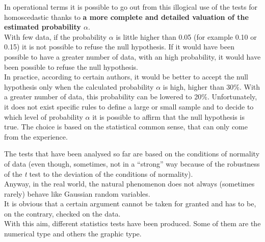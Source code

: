 \begin{frame}
  \begin{small}
    \vspace*{.25cm}
    In operational terms it is possible to go out from this illogical use of the tests for homoscedastic thanks to  \textbf{a more complete and detailed valuation of the estimated probability {\boldmath $ \alpha $}}.\\
    With few data, if the probability $ \alpha $ is little higher than 0.05 (for example 0.10 or 0.15) it is not possible to refuse the null hypothesis. If it would have been possible to have a greater number of data, with an high probability, it would have been possible to refuse the null hypothesis.\\
    \vspace*{.25cm}
    In practice, according to certain authors, it would be better to accept the null hypothesis only when the calculated probability $ \alpha $ is high, higher than 30\%. With a greater number of data, this probability can be lowered to 20\%. Unfortunately, it does not exist specific rules to define a large or small sample and to decide to which level of probability $ \alpha $ it is possible to affirm that the null hypothesis is true. The choice is based on the statistical common sense, that can only come from the experience.
  \end{small}
\end{frame}




\begin{frame}
  \vspace*{.25cm}
  The tests that have been analysed so far are based on the conditions of normality of data (even though, sometimes, not in a ``strong'' way because of the robustness of the \textit{t} test to the deviation of the conditions of normality).\\
  \vspace*{.25cm}
  Anyway, in the real world, the natural phenomenon does not always (sometimes rarely) behave like Gaussian random variables.\\
  \vspace*{.25cm}
  It is obvious that a certain argument cannot be taken for granted and has to be, on the contrary, checked on the data.\\
  \vspace*{.25cm}
  With this aim, different statistics tests have been produced. Some of them are the numerical type and others the graphic type.
\end{frame}

